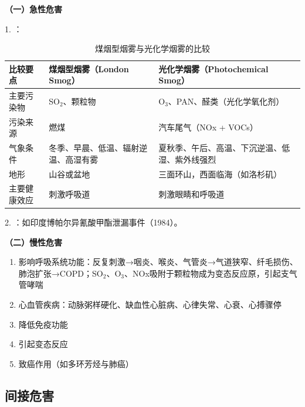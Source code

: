 \begin{keybox}
\textbf{（一）急性危害}

1. ：

\begin{table}[H]
\centering
\caption{煤烟型烟雾与光化学烟雾的比较}
\begin{tabularx}{\textwidth}{lXX}
\hline
\textbf{比较要点} & \textbf{煤烟型烟雾（London Smog）} & \textbf{光化学烟雾（Photochemical Smog）} \\
\hline
主要污染物 & SO$_2$、颗粒物 & O$_3$、PAN、醛类（光化学氧化剂） \\
污染来源 & 燃煤 & 汽车尾气（NOx + VOCs） \\
气象条件 & 冬季、早晨、低温、辐射逆温、高湿有雾 & 夏秋季、午后、高温、下沉逆温、低湿、紫外线强烈 \\
地形 & 山谷或盆地 & 三面环山，西面临海（如洛杉矶） \\
主要健康效应 & 刺激呼吸道 & 刺激眼睛和呼吸道 \\
\hline
\end{tabularx}
\end{table}

2. ：如印度博帕尔异氰酸甲酯泄漏事件（1984）。

\textbf{（二）慢性危害}
\begin{enumerate}[leftmargin=*]
    \item 影响呼吸系统功能：反复刺激→咽炎、喉炎、气管炎→气道狭窄、纤毛损伤、肺泡扩张→COPD；SO$_2$、O$_3$、NOx吸附于颗粒物成为变态反应原，引起支气管哮喘
    \item 心血管疾病：动脉粥样硬化、缺血性心脏病、心律失常、心衰、心搏骤停
    \item 降低免疫功能
    \item 引起变态反应
    \item 致癌作用（如多环芳烃与肺癌）
\end{enumerate}
\end{keybox}

\subsection{间接危害}

